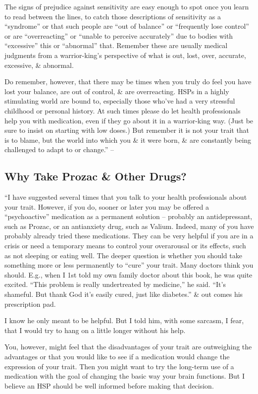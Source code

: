\documentclass{article}
\numberwithin{equation}{section}
\begin{document}
The signs of prejudice against sensitivity are easy enough to spot once you learn to read between the lines, to catch those descriptions of sensitivity as a ``syndrome'' or that such people are ``out of balance'' or ``frequently lose control'' or are ``overreacting'' or ``unable to perceive accurately'' due to bodies with ``excessive'' this or ``abnormal'' that. Remember these are usually medical judgments from a warrior-king's perspective of what is out, lost, over, accurate, excessive, \& abnormal.

Do remember, however, that there may be times when you truly do feel you have lost your balance, are out of control, \& are overreacting. HSPs in a highly stimulating world are bound to, especially those who've had a very stressful childhood or personal history. At such times please do let health professionals help you with medication, even if they go about it in a warrior-king way. (Just be sure to insist on starting with low doses.) But remember it is not your trait that is to blame, but the world into which you \& it were born, \& are constantly being challenged to adapt to or change.'' -- \cite[pp. 225--226]{Aron2013}

\subsection{Why Take Prozac \& Other Drugs?}
``I have suggested several times that you talk to your health professionals about your trait. However, if you do, sooner or later you may be offered a ``psychoactive'' medication as a permanent solution -- probably an antidepressant, such as Prozac, or an antianxiety drug, such as Valium. Indeed, many of you have probably already tried these medications. They can be very helpful if you are in a crisis or need a temporary means to control your overarousal or its effects, such as not sleeping or eating well. The deeper question is whether you should take something more or less permanently to ``cure'' your trait. Many doctors think you should. E.g., when I 1st told my own family doctor about this book, he was quite excited. ``This problem is really undertreated by medicine,'' he said. ``It's shameful. But thank God it's easily cured, just like diabetes.'' \& out comes his prescription pad.

I know he only meant to be helpful. But I told him, with some sarcasm, I fear, that I would try to hang on a little longer without his help.

You, however, might feel that the disadvantages of your trait are outweighing the advantages or that you would like to see if a medication would change the expression of your trait. Then you might want to try the long-term use of a medication with the goal of changing the basic way your brain functions. But I believe an HSP should be well informed before making that decision.
\end{document}
